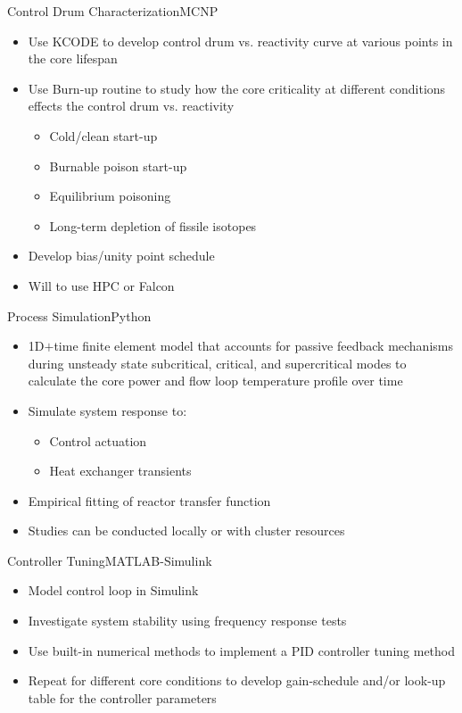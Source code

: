 \documentclass[aspectratio=169,pdftex,dvipsnames]{beamer}
\begin{document}
\begin{frame}{Control Drum Characterization}{MCNP}
    \begin{itemize}
        \item Use KCODE to develop control drum vs. reactivity curve at various points in the core lifespan
        \item Use Burn-up routine to study how the core criticality at different conditions effects the control drum vs. reactivity
        \begin{itemize}
            \item Cold/clean start-up
            \item Burnable poison start-up
            \item Equilibrium poisoning
            \item Long-term depletion of fissile isotopes
        \end{itemize} 
        \item Develop bias/unity point schedule 
        \item Will to use HPC or Falcon
    \end{itemize}
\end{frame}

\begin{frame}{Process Simulation}{Python}
    \begin{itemize}
        \item 1D$+$time finite element model that accounts for passive feedback mechanisms during unsteady state subcritical, critical, and supercritical modes to calculate the core power and flow loop temperature profile over time
        \item Simulate system response to:
        \begin{itemize}
            \item Control actuation
            \item Heat exchanger transients
        \end{itemize}
        \item Empirical fitting of reactor transfer function
        \item Studies can be conducted locally or with cluster resources
    \end{itemize}
\end{frame}

\begin{frame}{Controller Tuning}{MATLAB-Simulink}
    \begin{itemize}
        \item Model control loop in Simulink
        \item Investigate system stability using frequency response tests
        \item Use built-in numerical methods to implement a PID controller tuning method
        \item Repeat for different core conditions to develop gain-schedule and/or look-up table for the controller parameters
    \end{itemize}
\end{frame}
\end{document}
